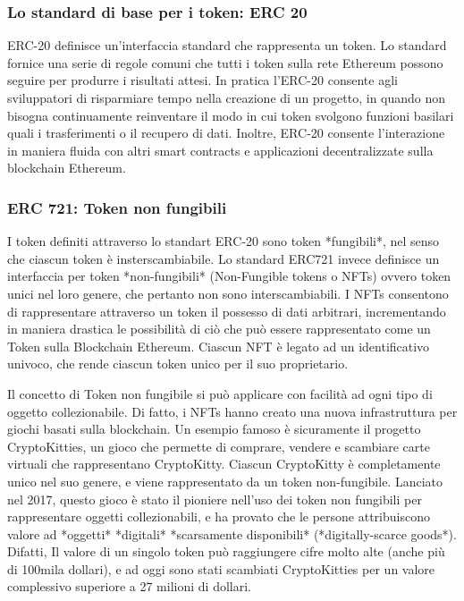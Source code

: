 \subsubsection{Lo standard di base per i token: ERC 20}

ERC-20 definisce un’interfaccia standard che rappresenta un token. Lo standard fornice una serie di regole comuni che tutti i token sulla rete Ethereum possono seguire per produrre i risultati attesi. In pratica l'ERC-20 consente agli sviluppatori di risparmiare tempo nella creazione di un progetto, in quando non bisogna continuamente reinventare il modo in cui token svolgono funzioni basilari quali  i trasferimenti o il recupero di dati. Inoltre, ERC-20 consente l'interazione in maniera fluida con altri smart contracts e applicazioni decentralizzate sulla blockchain Ethereum. 

\subsubsection{ERC 721: Token non fungibili}

I token definiti attraverso lo standart ERC-20 sono token *fungibili*, nel senso che ciascun token è insterscambiabile. Lo standard ERC721 invece definisce un interfaccia per token *non-fungibili* (Non-Fungible tokens o NFTs) ovvero token unici nel loro genere, che pertanto non sono interscambiabili. I NFTs consentono di rappresentare attraverso un token il possesso di dati arbitrari, incrementando in maniera drastica le possibilità di ciò che può essere rappresentato come un Token sulla Blockchain Ethereum. Ciascun NFT è legato ad un identificativo univoco, che rende ciascun token unico per il suo proprietario.

Il concetto di Token non fungibile si può applicare con facilità ad ogni tipo di oggetto collezionabile. Di fatto, i NFTs hanno creato una nuova infrastruttura per giochi basati sulla blockchain. Un esempio famoso è sicuramente il progetto CryptoKitties, un gioco che permette di comprare, vendere e scambiare carte virtuali che rappresentano CryptoKitty. Ciascun CryptoKitty è completamente unico nel suo genere, e viene rappresentato da un token non-fungibile. Lanciato nel 2017, questo gioco è stato il pioniere nell'uso dei token non fungibili per rappresentare oggetti collezionabili, e ha provato che le persone attribuiscono valore ad *oggetti* *digitali* *scarsamente disponibili* (*digitally-scarce goods*). Difatti, Il valore di un singolo token può raggiungere cifre molto alte (anche più di 100mila dollari), e ad oggi sono stati scambiati CryptoKitties per un valore complessivo superiore a 27 milioni di dollari.

